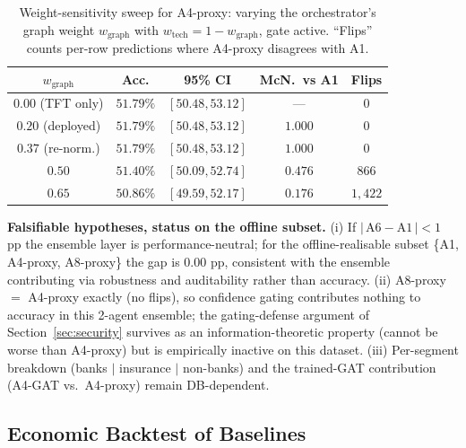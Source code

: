 \documentclass[conference]{IEEEtran}
\begin{document}
\begin{table}[htbp]
\centering
\caption{Weight-sensitivity sweep for A4-proxy: varying the orchestrator's graph weight $w_\text{graph}$ with $w_\text{tech} = 1 - w_\text{graph}$, gate active. ``Flips'' counts per-row predictions where A4-proxy disagrees with A1.}
\label{tab:weight_sensitivity}
\scriptsize
\setlength{\tabcolsep}{4pt}
\begin{tabular}{ccccc}
\toprule
$w_\text{graph}$ & \textbf{Acc.} & \textbf{95\% CI} & \textbf{McN.\ vs A1} & \textbf{Flips} \\
\midrule
$0.00$ (TFT only)     & $51.79\%$ & $[50.48, 53.12]$ & ---     & $0$       \\
$0.20$ (deployed)     & $51.79\%$ & $[50.48, 53.12]$ & $1.000$ & $0$       \\
$0.37$ (re-norm.)      & $51.79\%$ & $[50.48, 53.12]$ & $1.000$ & $0$       \\
$0.50$                 & $51.40\%$ & $[50.09, 52.74]$ & $0.476$ & $866$     \\
$0.65$                 & $50.86\%$ & $[49.59, 52.17]$ & $0.176$ & $1{,}422$ \\
\bottomrule
\end{tabular}
\end{table}

\textbf{Falsifiable hypotheses, status on the offline subset.} (i) If $|\,\text{A6} - \text{A1}\,|\!<\!1$ pp the ensemble layer is performance-neutral; for the offline-realisable subset \{A1, A4-proxy, A8-proxy\} the gap is $0.00$ pp, consistent with the ensemble contributing via robustness and auditability rather than accuracy. (ii) A8-proxy $=$ A4-proxy exactly (no flips), so confidence gating contributes nothing to accuracy in this 2-agent ensemble; the gating-defense argument of Section~\ref{sec:security} survives as an information-theoretic property (cannot be worse than A4-proxy) but is empirically inactive on this dataset. (iii) Per-segment breakdown (banks $\mid$ insurance $\mid$ non-banks) and the trained-GAT contribution (A4-GAT vs.\ A4-proxy) remain DB-dependent.

\subsection{Economic Backtest of Baselines}\label{sec:economic}
\end{document}
